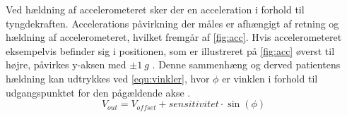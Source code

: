 \noindent
Ved hældning af accelerometeret sker der en acceleration i forhold til tyngdekraften. Accelerations påvirkning der måles er afhængigt af retning og hældning af accelerometeret, hvilket fremgår af \autoref{fig:acc}. Hvis accelerometeret eksempelvis befinder sig i positionen, som er illustreret på \autoref{fig:acc} øverst til højre, påvirkes y-aksen med $\pm 1~g$ \citep{clifford2005}. Denne sammenhæng og derved patientens hældning kan udtrykkes ved \autoref{equ:vinkler}, hvor $\phi$ er vinklen i forhold til udgangspunktet for den pågældende akse \citep{clifford2005}.
\begin{equation} \label{equ:vinkler}
	V_{out} = V_{offset} + sensitivitet \cdot \sin(\phi)
\end{equation}